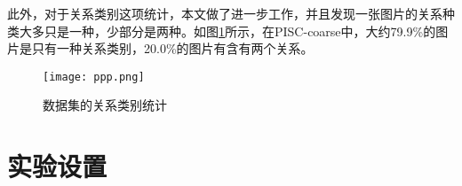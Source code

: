 此外，对于关系类别这项统计，本文做了进一步工作，并且发现一张图片的关系种类大多只是一种，少部分是两种。如图\ref{fig:exp-statistic}所示，在PISC-coarse中，大约79.9\%的图片是只有一种关系类别，20.0\%的图片有含有两个关系。

\begin{figure}[htpb]
	\centering
	\texttt{[image: ppp.png]}
    \caption{数据集的关系类别统计}
	\vspace*{-3.5mm}
	\label{fig:exp-statistic}
\end{figure}

\section{实验设置}

